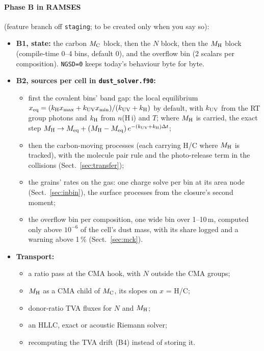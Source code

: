 \documentclass[11pt,a4paper]{article}
\newcommand{\MH}{M_{\rm H}}
\newcommand{\MC}{M_{\rm C}}
\begin{document}
\paragraph{Phase B in RAMSES} (feature branch off \texttt{staging}; to be created only when you say so):
\begin{itemize}
\item \textbf{B1, state:} the carbon $\MC$ block, then the $N$ block, then the $\MH$ block (compile-time 0--4 bins,
  default 0), and the overflow bin (2 scalars per composition). \texttt{NGSD=0} keeps today's behaviour byte for
  byte.
\item \textbf{B2, sources per cell in \texttt{dust\_solver.f90}:}
  \begin{itemize}
  \item first the covalent bins' band gap: the local equilibrium $x_{\rm eq} = (k_{\rm H}x_{\max} + k_{\rm UV}x_{\min})
    /(k_{\rm UV}+k_{\rm H})$ by default, with $k_{\rm UV}$ from the RT group photons and $k_{\rm H}$ from
    $n$(H\,{\sc i}) and $T$; where $\MH$ is carried, the exact step $\MH \to M_{\rm eq} + (\MH -
    M_{\rm eq})\,e^{-(k_{\rm UV}+k_{\rm H})\Delta t}$;
  \item then the carbon-moving processes (each carrying H/C where $\MH$ is tracked), with the molecule pair rule and
    the photo-release term in the collisions (Sect.~\ref{sec:transfer});
  \item the grains' rates on the gas: one charge solve per bin at its area node (Sect.~\ref{sec:inbin}), the
    surface processes from the closure's second moment;
  \item the overflow bin per composition, one wide bin over 1--10\,\textmu m, computed only above $10^{-6}$ of the
    cell's dust mass,
    with its share logged and a warning above 1\,\% (Sect.~\ref{sec:mck}).
  \end{itemize}
\item \textbf{Transport:}
  \begin{itemize}
  \item a ratio pass at the CMA hook, with $N$ outside the CMA groups;
  \item $\MH$ as a CMA child of $\MC$, its slopes on $x$ = H/C;
  \item donor-ratio TVA fluxes for $N$ and $\MH$;
  \item an HLLC, exact or acoustic Riemann solver;
  \item recomputing the TVA drift (B4) instead of storing it.
  \end{itemize}

\end{itemize}
\end{document}
